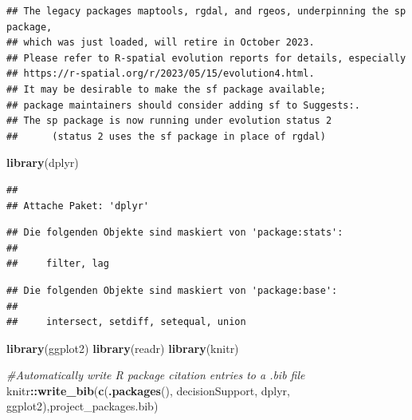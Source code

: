 \documentclass[
]{article}
\newenvironment{Shaded}{\begin{snugshade}}{\end{snugshade}}
\newcommand{\CommentTok}[1]{\textcolor[rgb]{0.56,0.35,0.01}{\textit{#1}}}
\newcommand{\FunctionTok}[1]{\textcolor[rgb]{0.13,0.29,0.53}{\textbf{#1}}}
\newcommand{\NormalTok}[1]{#1}
\newcommand{\SpecialCharTok}[1]{\textcolor[rgb]{0.81,0.36,0.00}{\textbf{#1}}}
\newcommand{\StringTok}[1]{\textcolor[rgb]{0.31,0.60,0.02}{#1}}
\begin{document}
\begin{verbatim}
## The legacy packages maptools, rgdal, and rgeos, underpinning the sp package,
## which was just loaded, will retire in October 2023.
## Please refer to R-spatial evolution reports for details, especially
## https://r-spatial.org/r/2023/05/15/evolution4.html.
## It may be desirable to make the sf package available;
## package maintainers should consider adding sf to Suggests:.
## The sp package is now running under evolution status 2
##      (status 2 uses the sf package in place of rgdal)
\end{verbatim}

\begin{Shaded}
\begin{Highlighting}[]
\FunctionTok{library}\NormalTok{(dplyr)}
\end{Highlighting}
\end{Shaded}

\begin{verbatim}
## 
## Attache Paket: 'dplyr'
\end{verbatim}

\begin{verbatim}
## Die folgenden Objekte sind maskiert von 'package:stats':
## 
##     filter, lag
\end{verbatim}

\begin{verbatim}
## Die folgenden Objekte sind maskiert von 'package:base':
## 
##     intersect, setdiff, setequal, union
\end{verbatim}

\begin{Shaded}
\begin{Highlighting}[]
\FunctionTok{library}\NormalTok{(ggplot2)}
\FunctionTok{library}\NormalTok{(readr)}
\FunctionTok{library}\NormalTok{(knitr)}

\CommentTok{\#Automatically write R package citation entries to a .bib file}
\NormalTok{knitr}\SpecialCharTok{::}\FunctionTok{write\_bib}\NormalTok{(}\FunctionTok{c}\NormalTok{(}\FunctionTok{.packages}\NormalTok{(),}
                   \StringTok{\textquotesingle{}decisionSupport\textquotesingle{}}\NormalTok{,}
                   \StringTok{\textquotesingle{}dplyr\textquotesingle{}}\NormalTok{,}
                   \StringTok{\textquotesingle{}ggplot2\textquotesingle{}}\NormalTok{),}\StringTok{\textquotesingle{}project\_packages.bib\textquotesingle{}}\NormalTok{)}
\end{Highlighting}
\end{Shaded}
\end{document}
